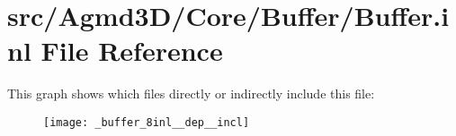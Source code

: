 \hypertarget{_buffer_8inl}{\section{src/\+Agmd3\+D/\+Core/\+Buffer/\+Buffer.inl File Reference}
\label{_buffer_8inl}
}
This graph shows which files directly or indirectly include this file\+:\nopagebreak
\begin{figure}[H]
\begin{center}
\leavevmode
\texttt{[image: \_buffer\_8inl\_\_dep\_\_incl]}
\end{center}
\end{figure}
